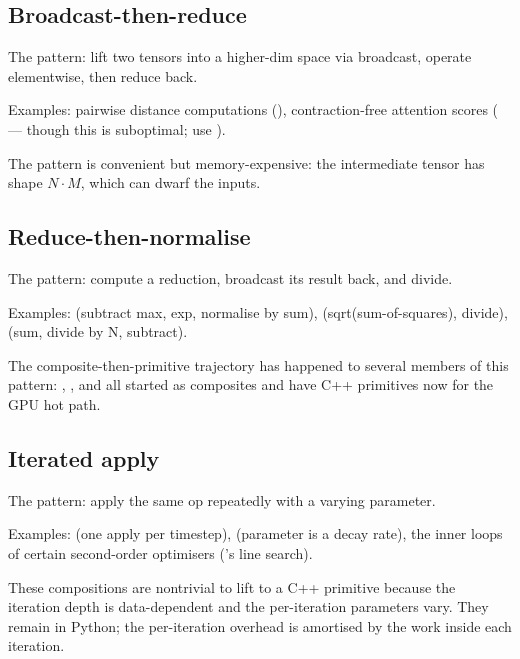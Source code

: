 \subsection{Broadcast-then-reduce}
\label{ssec:composite_ops:broadcast_reduce}

The pattern: lift two tensors into a higher-dim space via broadcast,
operate elementwise, then reduce back.

Examples: pairwise distance computations
(),
contraction-free attention scores
( ---
though this is suboptimal; use ).

The pattern is convenient but memory-expensive: the intermediate
tensor has shape $N \cdot M$, which can dwarf the inputs.

\subsection{Reduce-then-normalise}
\label{ssec:composite_ops:reduce_norm}

The pattern: compute a reduction, broadcast its result back, and
divide.

Examples:  (subtract max, exp, normalise by sum),
 (sqrt(sum-of-squares), divide),  (sum, divide by N, subtract).

The composite-then-primitive trajectory has happened to several
members of this pattern: , , and
 all started as composites and have C++
primitives now for the GPU hot path.

\subsection{Iterated apply}
\label{ssec:composite_ops:iterated}

The pattern: apply the same op repeatedly with a varying parameter.

Examples:  (one apply per timestep),
 (parameter is a decay rate),
the inner loops of certain second-order optimisers
('s line search).

These compositions are nontrivial to lift to a C++ primitive
because the iteration depth is data-dependent and the
per-iteration parameters vary. They remain in Python; the
per-iteration overhead is amortised by the work inside each
iteration.

